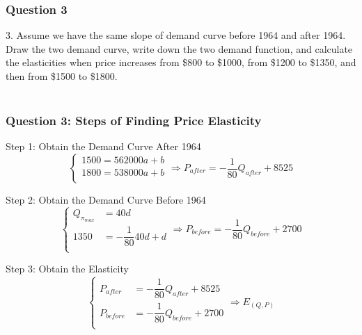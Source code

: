 \documentclass{beamer}
\begin{document}

\begin{frame}
	\frametitle{Question 3}
	
	3. Assume we have the same slope of demand curve before 1964 and after 1964. Draw the two demand curve, write down the two demand function, and calculate the elasticities when price increases from \$800 to \$1000, from \$1200 to \$1350, and then from \$1500 to \$1800.\\~\\
\end{frame}



\begin{frame}
	\frametitle{Question 3: Steps of Finding Price Elasticity}
	\begin{block}{Step 1: Obtain the Demand Curve After 1964}
		$$ \left\{
		\begin{aligned}
		1500 = 562000a + b\\
		1800 = 538000a + b\\
		\end{aligned}
		\right.\Rightarrow
		P_{\textit{after}} = -\dfrac{1}{80} Q_{\textit{after}} + 8525
		$$
	\end{block}
	
	\begin{block}{Step 2: Obtain the Demand Curve Before 1964}
		$$ \left\{
		\begin{aligned}
		Q_{\pi_{max}} &= 40d\\
		1350 &= -\dfrac{1}{80} 40d + d\\
		\end{aligned}
		\right.\Rightarrow
		P_{\textit{before}} = -\dfrac{1}{80} Q_{\textit{before}} + 2700
		$$
	\end{block}
	
	\begin{block}{Step 3: Obtain the Elasticity}
		$$ \left\{
		\begin{aligned}
		P_{\textit{after}}  &= -\dfrac{1}{80} Q_{\textit{after}} + 8525\\
		P_{\textit{before}} &= -\dfrac{1}{80} Q_{\textit{before}} + 2700\\
		\end{aligned}
		\right.\Rightarrow
		E_{(Q,P)}
		$$
	\end{block}
\end{frame}

\end{document}
